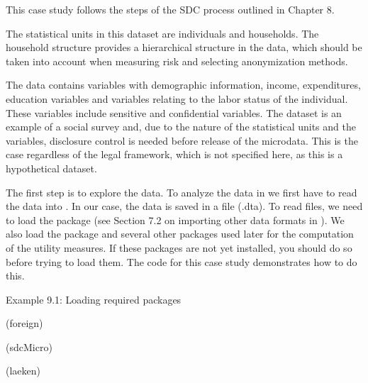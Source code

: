\documentclass[letterpaper,10pt,english]{sphinxmanual}
\begin{document}
This case study follows the steps of the SDC process outlined in Chapter
8.


The statistical units in this dataset are individuals and households.
The household structure provides a hierarchical structure in the data,
which should be taken into account when measuring risk and selecting
anonymization methods.

The data contains variables with demographic information, income,
expenditures, education variables and variables relating to the labor
status of the individual. These variables include sensitive and
confidential variables. The dataset is an example of a social survey
and, due to the nature of the statistical units and the variables,
disclosure control is needed before release of the microdata. This is
the case regardless of the legal framework, which is not specified here,
as this is a hypothetical dataset.


The first step is to explore the data. To analyze the data in  we
first have to read the data into . In our case, the data is saved in
a  file (.dta). To read  files, we need to load the 
package  (see Section 7.2 on importing other data formats in
). We also load the  package and several other packages
used later for the computation of the utility measures. If these
packages are not yet installed, you should do so before trying to load
them. The  code for this case study demonstrates how to do this.

Example 9.1: Loading required packages

\begin{DUlineblock}{0em}
\item[] 
\item[] (foreign) 
\item[] (sdcMicro) 
\end{DUlineblock}

(laeken) 
\end{document}
